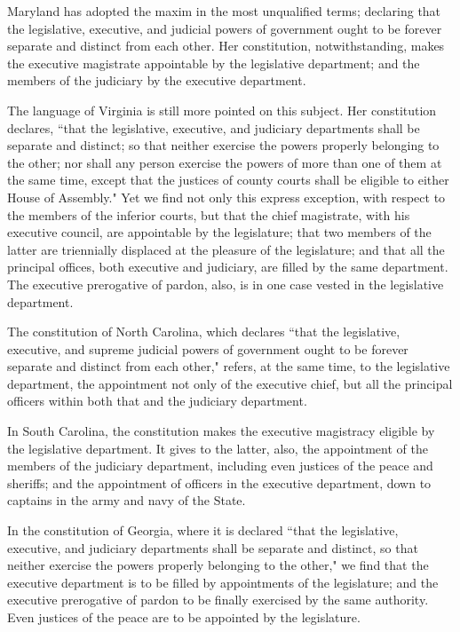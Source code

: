 Maryland has adopted the maxim in the most unqualified terms; declaring that the legislative, executive, and judicial powers of government ought to be forever separate and distinct from each other. Her constitution, notwithstanding, makes the executive magistrate appointable by the legislative department; and the members of the judiciary by the executive department.

The language of Virginia is still more pointed on this subject. Her constitution declares, ``that the legislative, executive, and judiciary departments shall be separate and distinct; so that neither exercise the powers properly belonging to the other; nor shall any person exercise the powers of more than one of them at the same time, except that the justices of county courts shall be eligible to either House of Assembly." Yet we find not only this express exception, with respect to the members of the inferior courts, but that the chief magistrate, with his executive council, are appointable by the legislature; that two members of the latter are triennially displaced at the pleasure of the legislature; and that all the principal offices, both executive and judiciary, are filled by the same department. The executive prerogative of pardon, also, is in one case vested in the legislative department.

The constitution of North Carolina, which declares ``that the legislative, executive, and supreme judicial powers of government ought to be forever separate and distinct from each other," refers, at the same time, to the legislative department, the appointment not only of the executive chief, but all the principal officers within both that and the judiciary department.

In South Carolina, the constitution makes the executive magistracy eligible by the legislative department. It gives to the latter, also, the appointment of the members of the judiciary department, including even justices of the peace and sheriffs; and the appointment of officers in the executive department, down to captains in the army and navy of the State.

In the constitution of Georgia, where it is declared ``that the legislative, executive, and judiciary departments shall be separate and distinct, so that neither exercise the powers properly belonging to the other," we find that the executive department is to be filled by appointments of the legislature; and the executive prerogative of pardon to be finally exercised by the same authority. Even justices of the peace are to be appointed by the legislature.

